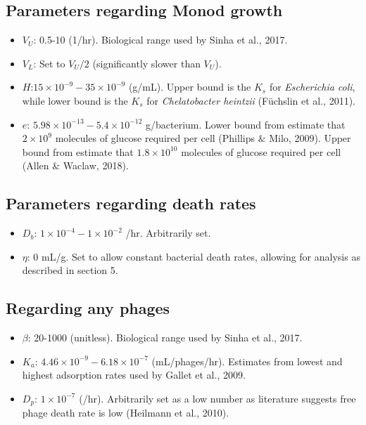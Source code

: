 \documentclass{article}
\begin{document}
\subsection{Parameters regarding Monod growth}

\begin{itemize}
\item $V_U$: 0.5-10 (1/hr). Biological range used by Sinha et al., 2017. 

\item $V_L$: Set to $V_U/2$ (significantly slower than $V_U$).

\item $H$:$15 \times 10^{-9} - 35 \times 10^{-9}$ (g/mL). Upper bound is the $K_s$ for \textit{Escherichia coli}, while lower bound is the $K_s$ for \textit{Chelatobacter heintzii} (Füchslin et al., 2011). 

\item $e$: $5.98\times 10^{-13} - 5.4 \times 10^{-12}$ g/bacterium. Lower bound from estimate that $2 \times 10^9$ molecules of glucose required per cell (Phillips $\&$ Milo, 2009).  Upper bound from estimate that $1.8 \times 10^{10}$ molecules of glucose required per cell (Allen $\&$ Waclaw, 2018). 
\end{itemize}

\subsection{Parameters regarding death rates}
\begin{itemize}
\item $D_b$: $1 \times 10^{-4} - 1 \times 10^{-2}$ /hr. Arbitrarily set.

\item $\eta$: 0 mL/g. Set to allow constant bacterial death rates, allowing for analysis as described in section 5.
\end{itemize}

\subsection{Regarding any phages}
\begin{itemize}
\item $\beta$: 20-1000 (unitless). Biological range used by Sinha et al., 2017. 
\item $K_a$: $4.46 \times 10^{-9} - 6.18 \times 10^{-7}$ (mL/phages/hr). Estimates from lowest and highest adsorption rates used by Gallet et al., 2009.
\item $D_p$: $1 \times 10^{-7}$ (/hr). Arbitrarily set as a low number as literature suggests free phage death rate is low (Heilmann et al., 2010).
\end{itemize}
\end{document}
